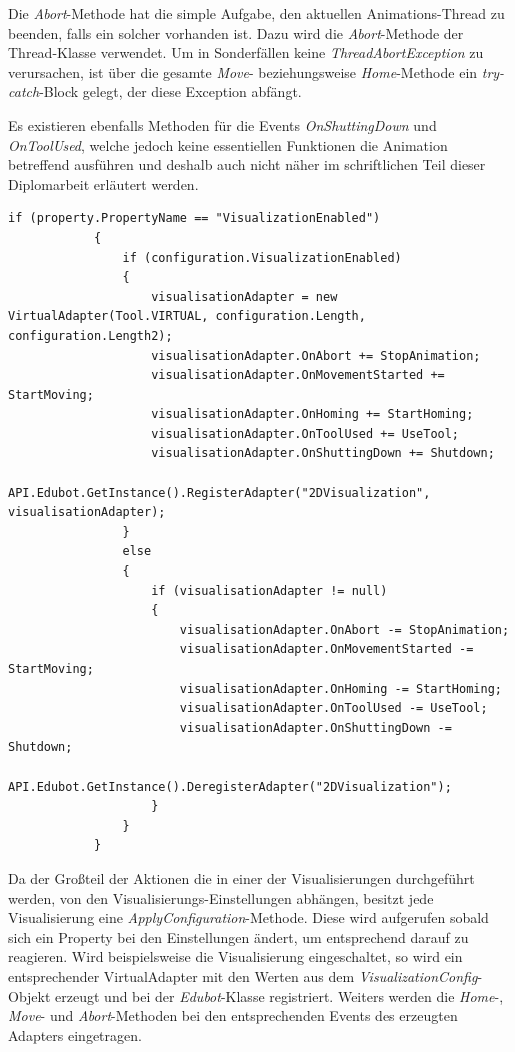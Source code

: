 Die \textit{Abort}-Methode hat die simple Aufgabe, den aktuellen Animations-Thread zu beenden, falls ein solcher vorhanden ist. Dazu wird die \textit{Abort}-Methode der Thread-Klasse verwendet. Um in Sonderfällen keine \textit{ThreadAbortException} zu verursachen, ist über die gesamte \textit{Move}- beziehungsweise \textit{Home}-Methode ein \textit{try-catch}-Block gelegt, der diese Exception abfängt.

Es existieren ebenfalls Methoden für die Events \textit{OnShuttingDown} und \textit{OnToolUsed}, welche jedoch keine essentiellen Funktionen die Animation betreffend ausführen und deshalb auch nicht näher im schriftlichen Teil dieser Diplomarbeit erläutert werden.

\begin{lstlisting}[language=CSharp, caption={Ausschnitt aus der ApplyConfiguration-Methode der 2D-Visualisierung}, captionpos=b]
if (property.PropertyName == "VisualizationEnabled")
            {
                if (configuration.VisualizationEnabled)
                {
                    visualisationAdapter = new VirtualAdapter(Tool.VIRTUAL, configuration.Length, configuration.Length2);
                    visualisationAdapter.OnAbort += StopAnimation;
                    visualisationAdapter.OnMovementStarted += StartMoving;
                    visualisationAdapter.OnHoming += StartHoming;
                    visualisationAdapter.OnToolUsed += UseTool;
                    visualisationAdapter.OnShuttingDown += Shutdown;
                    API.Edubot.GetInstance().RegisterAdapter("2DVisualization", visualisationAdapter);
                }
                else
                {
                    if (visualisationAdapter != null)
                    {
                        visualisationAdapter.OnAbort -= StopAnimation;
                        visualisationAdapter.OnMovementStarted -= StartMoving;
                        visualisationAdapter.OnHoming -= StartHoming;
                        visualisationAdapter.OnToolUsed -= UseTool;
                        visualisationAdapter.OnShuttingDown -= Shutdown;
                        API.Edubot.GetInstance().DeregisterAdapter("2DVisualization");
                    }
                }
            }
\end{lstlisting}

Da der Großteil der Aktionen die in einer der Visualisierungen durchgeführt werden, von den Visualisierungs-Einstellungen abhängen, besitzt jede Visualisierung eine \textit{ApplyConfiguration}-Methode. Diese wird aufgerufen sobald sich ein Property bei den Einstellungen ändert, um entsprechend darauf zu reagieren. Wird beispielsweise die Visualisierung eingeschaltet, so wird ein entsprechender VirtualAdapter mit den Werten aus dem \textit{VisualizationConfig}-Objekt erzeugt und bei der \textit{Edubot}-Klasse registriert. Weiters werden die \textit{Home}-, \textit{Move}- und \textit{Abort}-Methoden bei den entsprechenden Events des erzeugten Adapters eingetragen.

